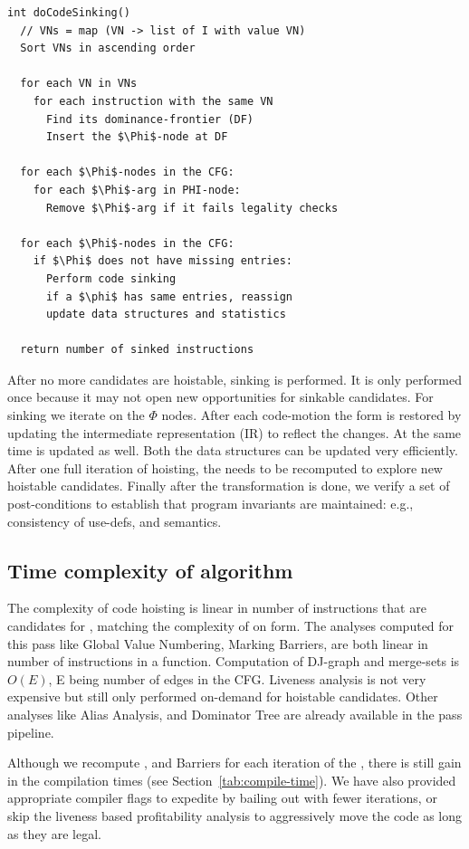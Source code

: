 \documentclass[sigplan,10pt,review,anonymous]{acmart}\settopmatter{printfolios=true,printccs=false,printacmref=false}
\begin{document}
\begin{lstlisting}
int doCodeSinking()
  // VNs = map (VN -> list of I with value VN)
  Sort VNs in ascending order

  for each VN in VNs
    for each instruction with the same VN
      Find its dominance-frontier (DF)
      Insert the $\Phi$-node at DF

  for each $\Phi$-nodes in the CFG:
    for each $\Phi$-arg in PHI-node:
      Remove $\Phi$-arg if it fails legality checks

  for each $\Phi$-nodes in the CFG:
    if $\Phi$ does not have missing entries:
      Perform code sinking
      if a $\phi$ has same entries, reassign
      update data structures and statistics

  return number of sinked instructions
\end{lstlisting}

After no more candidates are hoistable, sinking is performed. It is only
performed once because it may not open new opportunities for sinkable
candidates. For sinking we iterate on the $\Phi$ nodes. After each code-motion
the \SSA{} form is restored by updating the intermediate representation (IR) to
reflect the changes. At the same time \MemorySSA{} is updated as well. Both the
data structures can be updated very efficiently. After one full iteration of
hoisting, the \GVN{} needs to be recomputed to explore new hoistable candidates.
Finally after the transformation is done, we verify a set of post-conditions to
establish that program invariants are maintained: e.g., consistency of use-defs,
and \SSA{} semantics.


\subsection{Time complexity of algorithm}
The complexity of code hoisting is linear in number of instructions that are
candidates for \gcm{}, matching the complexity of \PRE{} on \SSA{} form.  The
analyses computed for this pass like Global Value Numbering, Marking Barriers,
are both linear in number of instructions in a function. Computation of DJ-graph
and merge-sets is $O(E)$, E being number of edges in the CFG. Liveness analysis
is not very expensive \cite{das2012} but still only performed on-demand for
hoistable candidates. Other analyses like Alias Analysis, \MemorySSA{} and
Dominator Tree are already available in the \LLVM{} pass pipeline.

Although we recompute \GVN{}, and Barriers for each iteration of the \gcm{},
there is still gain in the compilation times (see
Section~\ref{tab:compile-time}). We have also provided appropriate compiler
flags to expedite \gcm{} by bailing out with fewer iterations, or skip the
liveness based profitability analysis to aggressively move the code as long as
they are legal.
\end{document}
